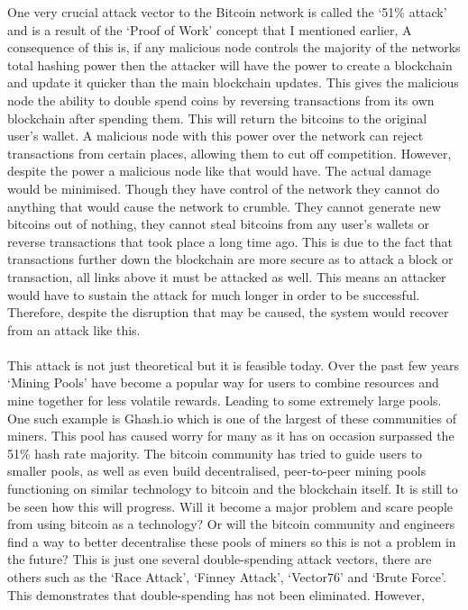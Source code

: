 \documentclass[10pt, a4paper]{report}
\begin{document}
One very crucial attack vector to the Bitcoin network is called the `51\% attack' and is
a result of the `Proof of Work' concept that I mentioned earlier,
A consequence of this is, if any malicious node controls
the majority of the networks total hashing power then the attacker will have
the power to create a blockchain and update it quicker than the main blockchain updates.
This gives the malicious node the ability to double spend coins by reversing
transactions from its own blockchain after spending them. This will return
the bitcoins to the original user's wallet. A malicious node with this power over the
network can reject transactions from certain places, allowing them to cut off
competition. However, despite the power a malicious node like that would have.
The actual damage would be minimised. Though they have control of
the network they cannot do anything that would cause the network to crumble.
They cannot generate new bitcoins out of nothing, they cannot steal bitcoins
from any user's wallets or reverse transactions that took place a long time ago.
This is due to the fact that transactions further down the blockchain are more secure as
to attack a block or transaction, all links above it must be attacked
as well. This means an attacker would have to sustain the attack for much longer in order
to be successful. Therefore, despite the disruption that may be caused,
the system would recover from an attack like this.
\\\\
This attack is not just theoretical but it is feasible today.
Over the past few years `Mining Pools' have become a popular way
for users to combine resources and mine together for less volatile rewards. Leading to some
extremely large pools. One such example is Ghash.io which is one of the
largest of these communities of miners. This pool has caused worry for many
as it has on occasion surpassed the 51\% hash rate majority.
The bitcoin community has tried to guide users to smaller pools, as well
as even build decentralised, peer-to-peer mining pools functioning on similar
technology to bitcoin and the blockchain itself.
It is still to be seen how this will progress. Will it become a major problem and
scare people from using bitcoin as a technology? Or will the bitcoin community
and engineers find a way to better decentralise these pools of miners so
this is not a problem in the future? This is just one several double-spending attack vectors, there
are others such as the `Race Attack', `Finney Attack', `Vector76' and `Brute Force'.
This demonstrates that double-spending has not been eliminated. However,
\end{document}
